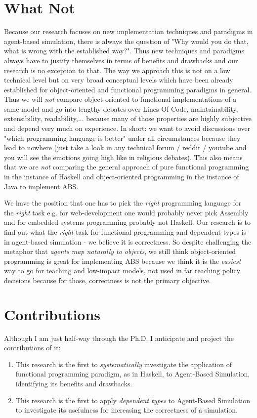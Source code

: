 \section{What Not}
Because our research focuses on new implementation techniques and paradigms in agent-based simulation, there is always the question of "Why would you do that, what is wrong with the established way?". Thus new techniques and paradigms always have to justify themselves in terms of benefits and drawbacks and our research is no exception to that. The way we approach this is not on a low technical level but on very broad conceptual levels which have been already established for object-oriented and functional programming paradigms in general. Thus we will \textit{not} compare object-oriented to functional implementations of a same model and go into lengthy debates over Lines Of Code, maintainability, extensibility, readability,... because many of those properties are highly subjective and depend very much on experience. In short: we want to avoid discussions over "which programming language is better" under all circumstances because they lead to nowhere (just take a look in any technical forum / reddit / youtube and you will see the emotions going high like in religious debates). This also means that we are \textit{not} comparing the general approach of pure functional programming in the instance of Haskell and object-oriented programming in the instance of Java to implement ABS.

We have the position that one has to pick the \textit{right} programming language for the \textit{right} task e.g. for web-development one would probably never pick Assembly and for embedded systems programming probably not Haskell. Our research is to find out what the \textit{right} task for functional programming and dependent types is in agent-based simulation - we believe it is correctness. So despite challenging the metaphor that \textit{agents map naturally to objects}, we still think object-oriented programming is great for implementing ABS because we think it is the \textit{easiest} way to go for teaching and low-impact models, not used in far reaching policy decisions because for those, correctness is not the primary objective.

\section{Contributions}
Although I am just half-way through the Ph.D. I anticipate and project the contributions of it:

\begin{enumerate}
	\item This research is the first to \textit{systematically} investigate the application of functional programming paradigm, as in Haskell, to Agent-Based Simulation, identifying its benefits and drawbacks.
	\item This research is the first to apply \textit{dependent types} to Agent-Based Simulation to investigate its usefulness for increasing the correctness of a simulation.
\end{enumerate}